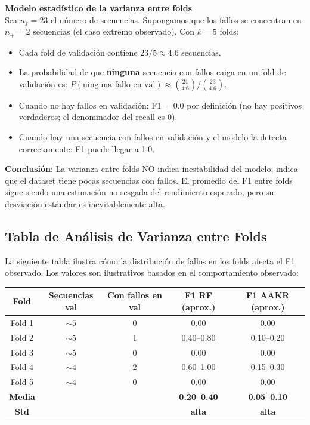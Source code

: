 \documentclass[12pt,a4paper]{article}
\begin{document}
\begin{porquebox}
\textbf{Modelo estad\'{i}stico de la varianza entre folds}\\[4pt]
Sea $n_f = 23$ el n\'{u}mero de secuencias. Supongamos que los fallos se concentran
en $n_+ = 2$ secuencias (el caso extremo observado). Con $k=5$ folds:
\begin{itemize}[itemsep=2pt]
  \item Cada fold de validaci\'{o}n contiene $23/5 \approx 4.6$ secuencias.
  \item La probabilidad de que \textbf{ninguna} secuencia con fallos cai\-ga en un fold
    de validaci\'{o}n es: $P(\text{ninguna fallo en val}) \approx \binom{21}{4.6}/\binom{23}{4.6}$.
  \item Cuando no hay fallos en validaci\'{o}n: F1 = 0.0 por definici\'{o}n (no hay positivos
    verdaderos; el denominador del recall es 0).
  \item Cuando hay una secuencia con fallos en validaci\'{o}n y el modelo la detecta
    correctamente: F1 puede llegar a 1.0.
\end{itemize}
\textbf{Conclusi\'{o}n}: La varianza entre folds NO indica inestabilidad del modelo;
indica que el dataset tiene pocas secuencias con fallos. El promedio del F1 entre
folds sigue siendo una estimaci\'{o}n no sesgada del rendimiento esperado, pero su
desviaci\'{o}n est\'{a}ndar es inevitablemente alta.
\end{porquebox}

\subsection{Tabla de An\'{a}lisis de Varianza entre Folds}

La siguiente tabla ilustra c\'{o}mo la distribuci\'{o}n de fallos en los folds afecta
el F1 observado. Los valores son ilustrativos basados en el comportamiento observado:

\begin{center}
\begin{tabular}{ccccc}
\toprule
\textbf{Fold} & \textbf{Secuencias val} & \textbf{Con fallos en val} & \textbf{F1 RF (aprox.)} & \textbf{F1 AAKR (aprox.)} \\
\midrule
Fold 1 & $\sim 5$ & 0 & 0.00 & 0.00 \\
Fold 2 & $\sim 5$ & 1 & 0.40--0.80 & 0.10--0.20 \\
Fold 3 & $\sim 5$ & 0 & 0.00 & 0.00 \\
Fold 4 & $\sim 4$ & 2 & 0.60--1.00 & 0.15--0.30 \\
Fold 5 & $\sim 4$ & 0 & 0.00 & 0.00 \\
\midrule
\textbf{Media} & & & \textbf{0.20--0.40} & \textbf{0.05--0.10} \\
\textbf{Std} & & & \textbf{alta} & \textbf{alta} \\
\bottomrule
\end{tabular}
\end{center}
\end{document}

